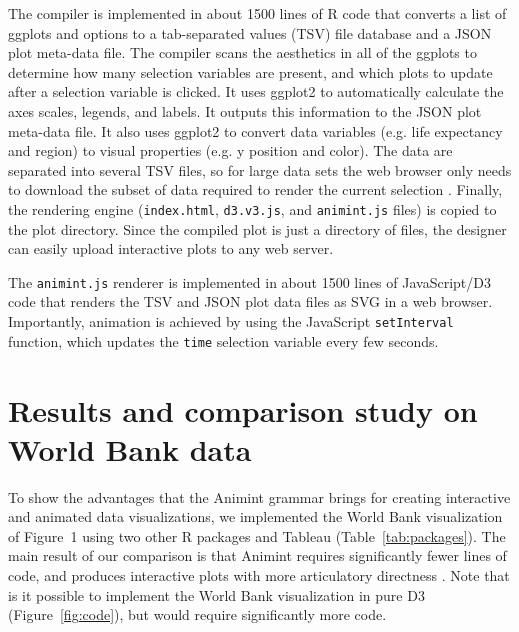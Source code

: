 \documentclass[10pt,journal,compsoc]{IEEEtran}\usepackage[]{graphicx}\usepackage[]{color}
\begin{document}
The compiler is implemented in about 1500 lines of R code that
converts a list of ggplots and options to a tab-separated values
(TSV) file database and a JSON plot meta-data file. The compiler scans
the aesthetics in all of the ggplots to determine how many selection
variables are present, and which plots to update after a selection
variable is clicked. It uses ggplot2 to automatically calculate
the axes scales, legends, and labels. It outputs this information to
the JSON plot meta-data file. It also uses ggplot2 to convert data
variables (e.g. life expectancy and region) to visual properties
(e.g. y position and color). The data are separated into several TSV
files, so for large data sets the web browser only needs to download
the subset of data required to render the current selection
\citep{2013-immens}. Finally, the rendering engine
(\texttt{index.html}, \texttt{d3.v3.js}, and \texttt{animint.js}
files) is copied to the plot directory. Since the compiled plot is
just a directory of files, the designer can easily upload interactive
plots to any web server.%

The \texttt{animint.js} renderer is implemented in about 1500 lines of
JavaScript/D3 code that renders the TSV and JSON plot data files as
SVG in a web browser.
Importantly, animation is achieved by using the JavaScript
\texttt{setInterval} function, which updates the \texttt{time}
selection variable every few seconds.

\section{Results and comparison study on World Bank data}
\label{sec:compare}

To show the advantages that the Animint grammar brings for creating
interactive and animated data visualizations, we implemented the World
Bank visualization of Figure~1 using two other R packages and Tableau
(Table~\ref{tab:packages}). The main result of our comparison is that
Animint requires significantly fewer lines of code, and produces
interactive plots with more articulatory directness
\citep{Hutchins:1985}. Note that is it possible to implement the World
Bank visualization in pure D3 (Figure~\ref{fig:code}), but would
require significantly more code.
\end{document}
